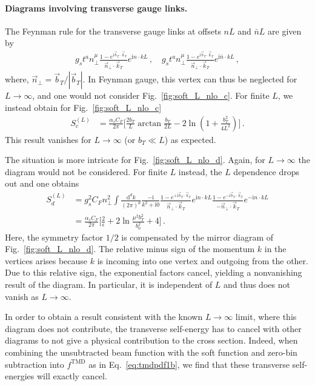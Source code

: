 \documentclass[11pt,a4paper]{article}
\DeclareRobustCommand{\eq}[1]{Eq.~\eqref{eq:#1}}
\DeclareRobustCommand{\fig}[1]{Fig.~\ref{fig:#1}}
\newcommand{\df}{\mathrm{d}}
\newcommand{\img}{\mathrm{i}}
\newcommand{\eps}{\epsilon}
\newcommand{\nn}{\nonumber}
\newcommand{\bn}{{\bar{n}}}
\newcommand{\as}{\alpha_s}
\newcommand\TMD{\mathrm{TMD}}
\newcommand{\bt}{\vec b_T}
\newcommand{\kt}{\vec k_T}
\begin{document}
\paragraph{Diagrams involving transverse gauge links.}
The Feynman rule for the transverse gauge links at offsets $n L$ and $\bn L$
are given by
\begin{align}
 g_s t^a n_\perp^\mu \frac{1 - e^{\img \bt \cdot \kt}}{\vec n_\perp \cdot \kt} e^{\img n \cdot k L}
\,,\quad
 g_s t^a n_\perp^\mu \frac{1 - e^{\img \bt \cdot \kt}}{\vec n_\perp \cdot \kt} e^{\img \bn \cdot k L}
\,,\end{align}
where, ${\vec n}_\perp = \bt / |\bt|$.
In Feynman gauge, this vertex can thus be neglected for $L\to\infty$, and one would not consider \fig{soft_L_nlo_c}.
For finite $L$, we instead obtain for \fig{soft_L_nlo_c} 
\begin{align} \label{eq:soft_L_c}
 S_c^{(L)} &
 = \frac{\as C_F}{2\pi} \biggl[ \frac{2 b_T}{L} \arctan\frac{b_T}{2L} - 2\ln\left(1 + \frac{b_T^2}{4L^2}\right) \biggr]
\,.\end{align}
This result vanishes for $L \to \infty$ (or $b_T \ll L$) as expected.

The situation is more intricate for \fig{soft_L_nlo_d}.
Again, for $L\to\infty$ the diagram would not be considered.
For finite $L$ instead, the $L$ dependence drops out and one obtains
\begin{align} \label{eq:soft_L_d}
 S_d^{(L)} &
 = g_s^2 C_F n_\perp^2 \int\frac{\df^d k}{(2\pi)^d} \frac{-\img}{k^2 + \img0}
    \frac{1 - e^{+\img \bt \cdot \kt}}{\vec n_\perp \cdot \kt} e^{\img n \cdot k L}
    \frac{1 - e^{-\img \bt \cdot \kt}}{-\vec n_\perp \cdot \kt} e^{-\img n \cdot k L}
\nn\\&
 = \frac{\as C_F}{2\pi} \biggl[ \frac{2}{\eps} + 2 \ln\frac{\mu^2 b_T^2}{b_0^2} + 4 \biggr]
\,.\end{align}
Here, the symmetry factor $1/2$ is compensated by the mirror diagram of \fig{soft_L_nlo_d}.
The relative minus sign of the momentum $k$ in the vertices arises because $k$ is incoming into one vertex and outgoing from the other.
Due to this relative sign, the exponential factors cancel, yielding a nonvanishing result of the diagram.
In particular, it is independent of $L$ and thus does not vanish as $L\to\infty$.

In order to obtain a result consistent with the known $L\to\infty$ limit, where this diagram does not contribute,
the transverse self-energy has to cancel with other diagrams to not give a physical contribution to the cross section.
Indeed, when combining the unsubtracted beam function with the soft function and zero-bin subtraction into $f^\TMD$ as in \eq{tmdpdf1b}, we find that these transverse self-energies will exactly cancel.
\end{document}
